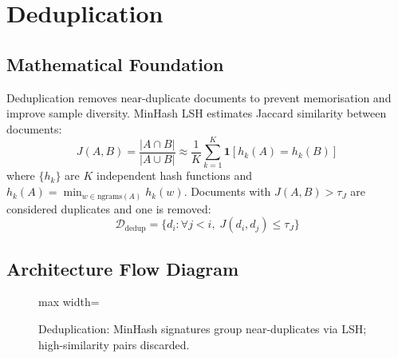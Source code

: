 \newpage
\section{Deduplication}

\subsection{Mathematical Foundation}
Deduplication removes near-duplicate documents to prevent memorisation and improve sample diversity. MinHash LSH estimates Jaccard similarity between documents:
\begin{equation}
  J(A,B) = \frac{|A \cap B|}{|A \cup B|} \approx \frac{1}{K}\sum_{k=1}^K \mathbf{1}[h_k(A) = h_k(B)]
\end{equation}
where $\{h_k\}$ are $K$ independent hash functions and $h_k(A) = \min_{w \in \text{ngrams}(A)} h_k(w)$. Documents with $J(A,B) > \tau_J$ are considered duplicates and one is removed:
\begin{equation}
  \mathcal{D}_{\text{dedup}} = \{d_i : \forall j < i,\; J(d_i, d_j) \leq \tau_J\}
\end{equation}

\subsection{Architecture Flow Diagram}

\begin{figure}[h]
\centering
\begin{adjustbox}{max width=\linewidth}
\end{adjustbox}
\caption{Deduplication: MinHash signatures group near-duplicates via LSH; high-similarity pairs discarded.}
\end{figure}

